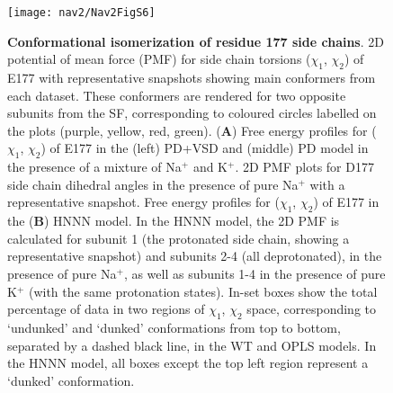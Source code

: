 \begin{refsection}
\begin{figure}[!ptb]
\centering
\texttt{[image: nav2/Nav2FigS6]}
\caption[Conformational isomerization of residue 177 side chains]{\textbf{Conformational isomerization of residue 177 side chains}. 2D potential of mean force (PMF) for side chain torsions ($\chi_1$, $\chi_2$) of E177 with representative snapshots showing main conformers from each dataset. These conformers are rendered for two opposite subunits from the SF, corresponding to coloured circles labelled on the plots (purple, yellow, red, green). (\textbf{A}) Free energy profiles for ($\chi_1$, $\chi_2$) of E177 in the (left) PD+VSD and (middle) PD model in the presence of a mixture of Na$^+$ and K$^+$. 2D PMF plots for D177 side chain dihedral angles in the presence of pure Na$^+$ with a representative snapshot. Free energy profiles for ($\chi_1$, $\chi_2$) of E177 in the (\textbf{B}) HNNN model. In the HNNN model, the 2D PMF is calculated for subunit 1 (the protonated side chain, showing a representative snapshot) and subunits 2-4 (all deprotonated), in the presence of pure Na$^+$, as well as subunits 1-4 in the presence of pure K$^+$ (with the same protonation states). In-set boxes show the total percentage of data in two regions of $\chi_1$, $\chi_2$ space, corresponding to `undunked' and `dunked' conformations from top to bottom, separated by a dashed black line, in the WT and OPLS models. In the HNNN model, all boxes except the top left region represent a `dunked' conformation.}
\label{fig:nav2figS6}
\end{figure}


\end{refsection}
